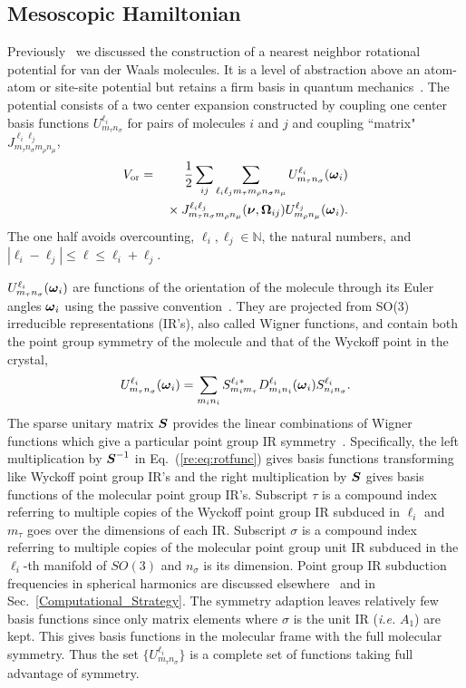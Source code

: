 \documentclass[preprint]{revtex4}
\newcommand{\mb}[1]{\ensuremath{\mbox{\boldmath $ #1 $}}}
\begin{document}
\subsection{Mesoscopic Hamiltonian}
\label{hamiltonian}

Previously~\cite{Mettes04} we discussed the construction of a
nearest neighbor rotational potential for van der Waals molecules.
It is a level of abstraction above an atom-atom or site-site
potential but retains a firm basis in quantum
mechanics~\cite{Avoird94}. The potential consists of a two center
expansion constructed by coupling one center basis functions
$U^{\ell_i}_{m_\tau n_\sigma}$ for pairs of molecules $i$ and $j$
and coupling ``matrix" $J_{m_\tau n_\sigma m_\rho n_\mu}^{\ell_i
\ell_j}$,
\begin{eqnarray}
\label{re:eq:vij2}V_{\mathrm{or}} &=&
\frac{1}{2}\sum_{ij}\sum_{\ell_i\ell_j m_\tau m_\rho n_\sigma n_\mu}
U^{\ell_i}_{m_\tau n_\sigma}(\mb{\omega}_i)\nonumber\\
&&{}\times J_{m_\tau n_\sigma m_\rho n_\mu}^{\ell_i
\ell_j}(\mb{\nu},\mb{\Omega}_{ij})U^{\ell_j}_{m_\rho
n_\mu}(\mb{\omega}_i).
\end{eqnarray}
The one half avoids overcounting, $\ell_i,\ell_j\in\mathbb{N}$, the
natural numbers, and $|\ell_i-\ell_j|\leq\ell\leq \ell_i+\ell_j$.

$U^{\ell_i}_{m_\tau n_\sigma}(\mb{\omega}_i)$ are functions of the
orientation of the molecule through its Euler angles $\mb{\omega}_i$
using the passive convention~\cite{Varshalovich88}.  They are
projected from SO(3) irreducible representations (IR's), also called
Wigner functions, and contain both the point group symmetry of the
molecule and that of the Wyckoff point in the crystal,
\begin{equation}
\label{re:eq:rotfunc}U^{\ell_i}_{m_\tau
n_\sigma}(\mb{\omega}_i)=\sum_{m_i n_i}S^{\ell_i*}_{m_im_\tau}D_{m_i
n_i}^{\ell_i}(\mb{\omega}_i)S^{\ell_i}_{n_in_\sigma}.
\end{equation}
The sparse unitary matrix $\mb{S}$ provides the linear combinations
of Wigner functions which give a particular point group IR
symmetry~\cite{Bradley72}.  Specifically, the left multiplication by
$\mb{S}^{-1}$ in Eq.~(\ref{re:eq:rotfunc}) gives basis functions
transforming like Wyckoff point group IR's and the right
multiplication by $\mb{S}$ gives basis functions of the molecular
point group IR's. Subscript $\tau$ is a compound index referring to
multiple copies of the Wyckoff point group IR subduced in $\ell_i$
and $m_\tau$ goes over the dimensions of each IR. Subscript $\sigma$
is a compound index referring to multiple copies of the molecular
point group unit IR subduced in the $\ell_i$-th manifold of $SO(3)$
and $n_\sigma$ is its dimension. Point group IR subduction
frequencies in spherical harmonics are discussed
elsewhere~\cite{Bradley72} and in Sec.~\ref{Computational_Strategy}.
The symmetry adaption leaves relatively few basis functions since
only matrix elements where $\sigma$ is the unit IR (\emph{i.e.}
$A_1$) are kept.  This gives basis functions in the molecular frame
with the full molecular symmetry.  Thus the set
$\{U^{\ell_i}_{m_\tau n_\sigma}\}$ is a complete set of functions
taking full advantage of symmetry.
\end{document}
